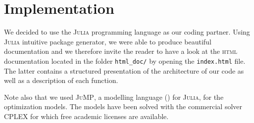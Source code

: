 \section{Implementation} %
\label{sec:implementation}
We decided to use the \textsc{Julia}
programming language as our coding partner.
Using \textsc{Julia} intuitive package generator, we were able to
produce beautiful documentation and we therefore invite
the reader to have a look at the \textsc{html} documentation located
in the folder \texttt{html\_doc/} by opening the \texttt{index.html} file.
The latter contains a structured presentation of the architecture
of our code as well as a description of each function.

Note also that we used \textsc{JuMP}, a modelling language (\cite{DunningHuchetteLubin2017}) for \textsc{Julia}, for the optimization models.
The models have been solved with the commercial solver \textsc{CPLEX} for which free academic licenses are available.
